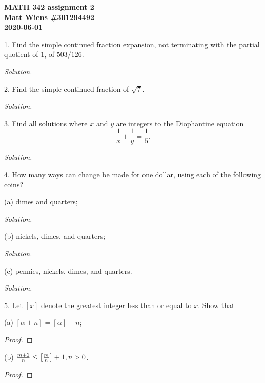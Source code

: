 \documentclass{article}
\begin{document}
\textbf{MATH 342 assignment 2} \\
\textbf{Matt Wiens \#301294492} \\
\textbf{2020-06-01}

1. Find the simple continued fraction expansion, not terminating with
   the partial quotient of $1$, of $503/126$.

\textit{Solution.}

\newpage

2. Find the simple continued fraction of $\sqrt{7}$.

\textit{Solution.}

\newpage

3. Find all solutions where $x$ and $y$ are integers to the Diophantine
   equation
%
\begin{equation*}
    \frac{1}{x} + \frac{1}{y} = \frac{1}{5}
    .
\end{equation*}

\textit{Solution.}

\newpage

4. How many ways can change be made for one dollar, using each of the following coins?

(a) dimes and quarters;

\textit{Solution.}

\vspace{5mm}

(b) nickels, dimes, and quarters;

\textit{Solution.}

\vspace{5mm}

(c) pennies, nickels, dimes, and quarters.

\textit{Solution.}

\newpage

5. Let $[x]$ denote the greatest integer less than or equal to $x$. Show that

(a) $[\alpha + n] = [\alpha] + n$;

\begin{proof}
\end{proof}

\vspace{5mm}

(b) $\frac{m + 1}{n} \leq \sbr{\frac{m}{n}} + 1, n > 0$.

\begin{proof}
\end{proof}
\end{document}
